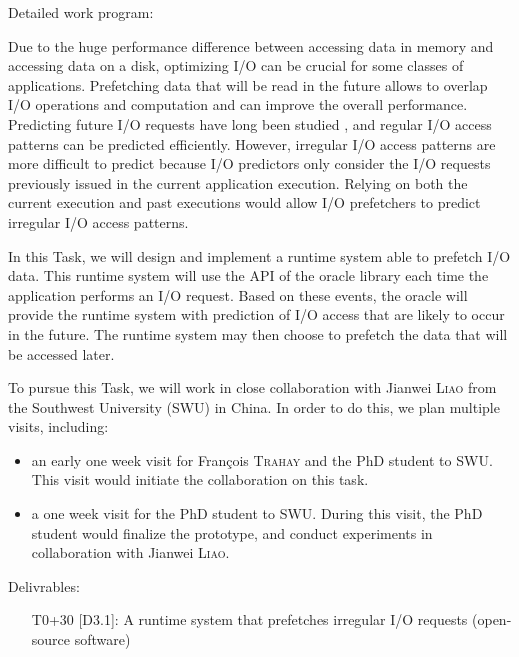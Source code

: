\documentclass[a4paper,11pt,defblank]{article}
\begin{document}
\begin{paragraph}{Detailed work program:}

  Due to the huge performance difference between accessing data in
  memory and accessing data on a disk, optimizing I/O can be crucial
  for some classes of applications. Prefetching data that will be read
  in the future allows to overlap I/O operations and computation and
  can improve the overall performance. Predicting future I/O requests
  have long been studied \cite{Patterson, chang1999automatic,
    cao1996implementation}, and regular I/O access patterns can be
  predicted efficiently. However, irregular I/O access patterns are
  more difficult to predict because I/O predictors only consider the
  I/O requests previously issued in the current application
  execution. Relying on both the current execution and past executions
  would allow I/O prefetchers to predict irregular I/O access
  patterns.

  In this Task, we will design and implement a runtime system able to
  prefetch I/O data. This runtime system will use the API of the
  oracle library each time the application performs an I/O
  request. Based on these events, the oracle will provide the runtime
  system with prediction of I/O access that are likely to occur in the
  future. The runtime system may then choose to prefetch the data that
  will be accessed later.

  To pursue this Task, we will work in close collaboration with
  Jianwei \textsc{Liao} from the Southwest University (SWU) in
  China. In order to do this, we plan multiple visits, including:
  \begin{itemize}
  \item an early one week visit for François \textsc{Trahay} and the
    PhD student to SWU. This visit would initiate the collaboration on this task.
  \item a one week visit for the PhD student to SWU. During this
    visit, the PhD student would finalize the prototype, and conduct
    experiments in collaboration with Jianwei \textsc{Liao}.
  \end{itemize}

\end{paragraph}

\begin{paragraph}{Delivrables:}
  \begin{itemize}
  \item[T0+30] [D3.1]: A runtime system that prefetches irregular I/O
    requests (open-source software)
  \end{itemize}
\end{paragraph}
\end{document}
